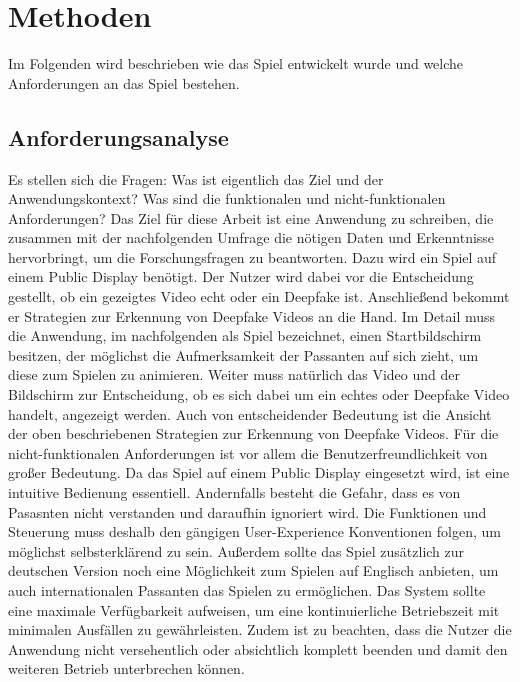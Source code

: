 \chapter{Methoden}
Im Folgenden wird beschrieben wie das Spiel entwickelt wurde und welche Anforderungen an das Spiel bestehen.
\section{Anforderungsanalyse}
Es stellen sich die Fragen: Was ist eigentlich das Ziel und der Anwendungskontext? 
Was sind die funktionalen und nicht-funktionalen Anforderungen?
Das Ziel für diese Arbeit ist eine Anwendung zu schreiben, die zusammen mit der nachfolgenden Umfrage die nötigen Daten und Erkenntnisse hervorbringt, um die Forschungsfragen zu beantworten.
Dazu wird ein Spiel auf einem Public Display benötigt. 
Der Nutzer wird dabei vor die Entscheidung gestellt, ob ein gezeigtes Video echt oder ein Deepfake ist. 
Anschließend bekommt er Strategien zur Erkennung von Deepfake Videos an die Hand. 
Im Detail muss die Anwendung, im nachfolgenden als Spiel bezeichnet, einen Startbildschirm besitzen, der möglichst die Aufmerksamkeit der Passanten auf sich zieht, um diese zum Spielen zu animieren. 
Weiter muss natürlich das Video und der Bildschirm zur Entscheidung, ob es sich dabei um ein echtes oder Deepfake Video handelt, angezeigt werden. 
Auch von entscheidender Bedeutung ist die Ansicht der oben beschriebenen Strategien zur Erkennung von Deepfake Videos.
Für die nicht-funktionalen Anforderungen ist vor allem die Benutzerfreundlichkeit von großer Bedeutung.
Da das Spiel auf einem Public Display eingesetzt wird, ist eine intuitive Bedienung essentiell. 
Andernfalls besteht die Gefahr, dass es von Pasasnten nicht verstanden und daraufhin ignoriert wird.
Die Funktionen und Steuerung muss deshalb den gängigen User-Experience Konventionen folgen, um möglichst selbsterklärend zu sein.
Außerdem sollte das Spiel zusätzlich zur deutschen Version noch eine Möglichkeit zum Spielen auf Englisch anbieten, um auch internationalen Passanten das Spielen zu ermöglichen.
Das System sollte eine maximale Verfügbarkeit aufweisen, um eine kontinuierliche Betriebszeit mit minimalen Ausfällen zu gewährleisten.
Zudem ist zu beachten, dass die Nutzer die Anwendung nicht versehentlich oder absichtlich komplett beenden und damit den weiteren Betrieb unterbrechen können.

